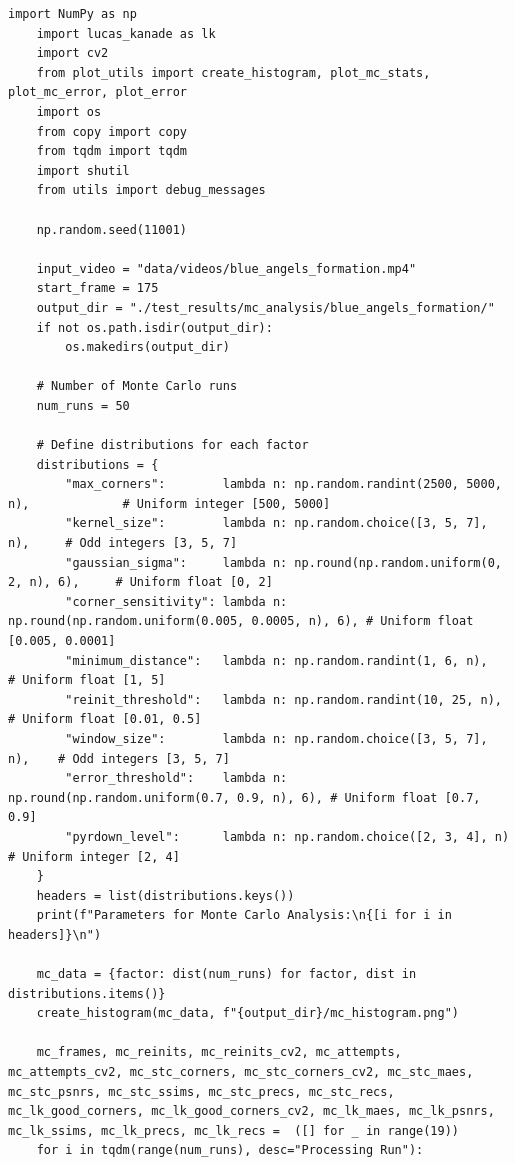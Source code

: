 \documentclass[11pt, conference, letterpaper]{IEEEtran}
\begin{document}
\begin{lstlisting}[style=python, caption={\texttt{monte\_carlo\_analysis.py}}, label={lst:mc}]
    import NumPy as np
    import lucas_kanade as lk
    import cv2
    from plot_utils import create_histogram, plot_mc_stats, plot_mc_error, plot_error
    import os
    from copy import copy
    from tqdm import tqdm
    import shutil
    from utils import debug_messages
    
    np.random.seed(11001)
    
    input_video = "data/videos/blue_angels_formation.mp4"
    start_frame = 175
    output_dir = "./test_results/mc_analysis/blue_angels_formation/"
    if not os.path.isdir(output_dir):
        os.makedirs(output_dir)
    
    # Number of Monte Carlo runs
    num_runs = 50
    
    # Define distributions for each factor
    distributions = {
        "max_corners":        lambda n: np.random.randint(2500, 5000, n),             # Uniform integer [500, 5000]
        "kernel_size":        lambda n: np.random.choice([3, 5, 7], n),     # Odd integers [3, 5, 7]
        "gaussian_sigma":     lambda n: np.round(np.random.uniform(0, 2, n), 6),     # Uniform float [0, 2]
        "corner_sensitivity": lambda n: np.round(np.random.uniform(0.005, 0.0005, n), 6), # Uniform float [0.005, 0.0001]
        "minimum_distance":   lambda n: np.random.randint(1, 6, n),                 # Uniform float [1, 5]
        "reinit_threshold":   lambda n: np.random.randint(10, 25, n),                 # Uniform float [0.01, 0.5]
        "window_size":        lambda n: np.random.choice([3, 5, 7], n),    # Odd integers [3, 5, 7]
        "error_threshold":    lambda n: np.round(np.random.uniform(0.7, 0.9, n), 6), # Uniform float [0.7, 0.9]
        "pyrdown_level":      lambda n: np.random.choice([2, 3, 4], n)                   # Uniform integer [2, 4]
    }
    headers = list(distributions.keys())
    print(f"Parameters for Monte Carlo Analysis:\n{[i for i in headers]}\n")
    
    mc_data = {factor: dist(num_runs) for factor, dist in distributions.items()}
    create_histogram(mc_data, f"{output_dir}/mc_histogram.png")
    
    mc_frames, mc_reinits, mc_reinits_cv2, mc_attempts, mc_attempts_cv2, mc_stc_corners, mc_stc_corners_cv2, mc_stc_maes, mc_stc_psnrs, mc_stc_ssims, mc_stc_precs, mc_stc_recs, mc_lk_good_corners, mc_lk_good_corners_cv2, mc_lk_maes, mc_lk_psnrs, mc_lk_ssims, mc_lk_precs, mc_lk_recs =  ([] for _ in range(19))
    for i in tqdm(range(num_runs), desc="Processing Run"):
        

\end{lstlisting}
\end{document}
